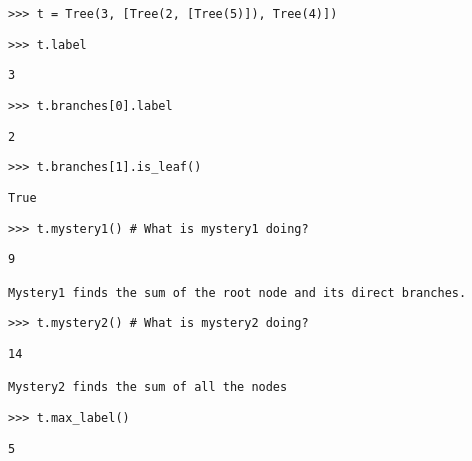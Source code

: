 \begin{blocksection}

\begin{lstlisting}
>>> t = Tree(3, [Tree(2, [Tree(5)]), Tree(4)])
\end{lstlisting}

\begin{lstlisting}
>>> t.label
\end{lstlisting}
\begin{solution}[.5in]
\begin{lstlisting}
3
\end{lstlisting}
\end{solution}

\begin{lstlisting}
>>> t.branches[0].label
\end{lstlisting}
\begin{solution}[.5in]
\begin{lstlisting}
2
\end{lstlisting}
\end{solution}

\begin{lstlisting}
>>> t.branches[1].is_leaf()
\end{lstlisting}
\begin{solution}[.5in]
\begin{lstlisting}
True
\end{lstlisting}
\end{solution}

\begin{lstlisting}
>>> t.mystery1() # What is mystery1 doing?
\end{lstlisting}
\begin{solution}[.5in]
\begin{lstlisting}
9

Mystery1 finds the sum of the root node and its direct branches.
\end{lstlisting}
\end{solution}

\begin{lstlisting}
>>> t.mystery2() # What is mystery2 doing?
\end{lstlisting}
\begin{solution}[.5in]
\begin{lstlisting}
14

Mystery2 finds the sum of all the nodes
\end{lstlisting}
\end{solution}

\begin{lstlisting}
>>> t.max_label()
\end{lstlisting}
\begin{solution}[.5in]
\begin{lstlisting}
5
\end{lstlisting}
\end{solution}
\end{blocksection}
